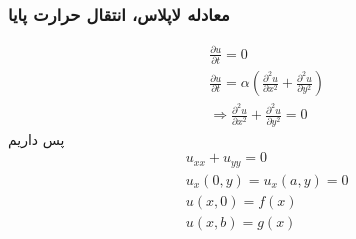 \subsubsection{
	معادله لاپلاس، انتقال حرارت پایا
}
\begin{equation*}
	\begin{aligned}
		{} &\ \frac{\partial u}{\partial t}=0 \\
		&\ \frac{\partial u}{\partial t}=\alpha(\frac{\partial^2 u}{\partial x^2}+\frac{\partial^2 u}{\partial y^2}) \\
		&\ \Rightarrow \frac{\partial^2 u}{\partial x^2}+\frac{\partial^2 u}{\partial y^2}=0
	\end{aligned}
\end{equation*}
پس داریم
\begin{equation*}
	\begin{aligned}
		{} &\ 
		u_{xx}+u_{yy}=0
		\\
		&\
		u_x(0,y)=u_x(a,y)=0
		\\
		&\
		u(x,0)=f(x)
		\\
		&\
		u(x,b)=g(x)
		\\
	\end{aligned}
\end{equation*}



